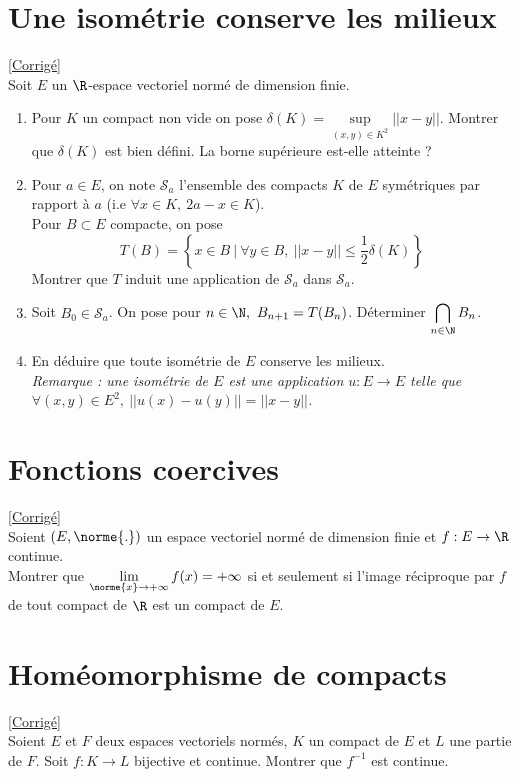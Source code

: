 \documentclass{book}
\begin{document}
\section{Une isométrie conserve les milieux }
\label{Une isométrie conserve les milieux}
\textcolor{blue}{\hyperref[sec:une-isometrie-conserve-les-milieux]{[Corrigé]}}\\
Soit $E$ un $\R$-espace vectoriel normé de dimension finie.
\begin{enumerate}[leftmargin=*]
	\item Pour $K$ un compact non vide on pose $\delta(K)=\sup\limits_{(x,y)\in K^2}{||x-y||}$. Montrer que $\delta(K)$ est bien défini. La borne supérieure est-elle atteinte ?
	\item Pour $a\in E$, on note $\mathcal{S}_a$ l'ensemble des compacts $K$ de $E$ symétriques par rapport à $a$ (i.e $\forall x\in K,\ 2a-x\in K$). \\
	Pour $B\subset E$ compacte, on pose
	$$T(B)=\left\{x\in B\ |\ \forall y\in B,\ ||x-y||\leq\displaystyle\frac{1}{2}\delta(K)\right\}$$
	Montrer que $T$ induit une application de $\mathcal{S}_a$ dans $\mathcal{S}_a$.
	\item Soit $B_0\in \mathcal{S}_a$. On pose pour $n\in \N,\ B_{n+1}=T(B_n)$. Déterminer $\displaystyle\bigcap\limits_{n\in \N}B_n$.
	\item En déduire que toute isométrie de $E$ conserve les milieux.\\
	\textit{Remarque : une isométrie de $E$ est une application $u:E\to E$ telle que $\forall (x,y)\in E^2,\ ||u(x)-u(y)||=||x-y||$.}
\end{enumerate}

\section{Fonctions coercives }
\label{Fonctions coercives}
\textcolor{blue}{\hyperref[sec:fonctions-coercives]{[Corrigé]}}\\
Soient $(E,\norme{.})$ un espace vectoriel normé de dimension finie et $f:E\to \R$ continue.\\
Montrer que $\lim\limits_{\norme{x}\to +\infty}f(x)=+\infty$ si et seulement si l'image réciproque par $f$ de tout compact de $\R$ est un compact de $E$.

\section{Homéomorphisme de compacts }
\label{Homéomorphisme de compacts}
\textcolor{blue}{\hyperref[sec:homeomorphisme-de-compacts]{[Corrigé]}}\\
Soient $E$ et $F$ deux espaces vectoriels normés, $K$ un compact de $E$ et $L$ une partie de $F$. Soit $f:K\to L$ bijective et continue. Montrer que $f^{-1}$ est continue.
\end{document}
